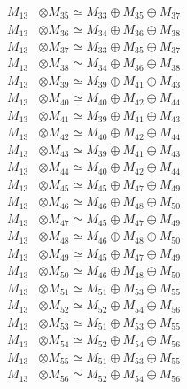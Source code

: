 \begin{align*}
M_{13} &\otimes M_{35} \simeq M_{33} \oplus M_{35} \oplus M_{37} \\
M_{13} &\otimes M_{36} \simeq M_{34} \oplus M_{36} \oplus M_{38} \\
M_{13} &\otimes M_{37} \simeq M_{33} \oplus M_{35} \oplus M_{37} \\
M_{13} &\otimes M_{38} \simeq M_{34} \oplus M_{36} \oplus M_{38} \\
M_{13} &\otimes M_{39} \simeq M_{39} \oplus M_{41} \oplus M_{43} \\
M_{13} &\otimes M_{40} \simeq M_{40} \oplus M_{42} \oplus M_{44} \\
M_{13} &\otimes M_{41} \simeq M_{39} \oplus M_{41} \oplus M_{43} \\
M_{13} &\otimes M_{42} \simeq M_{40} \oplus M_{42} \oplus M_{44} \\
M_{13} &\otimes M_{43} \simeq M_{39} \oplus M_{41} \oplus M_{43} \\
M_{13} &\otimes M_{44} \simeq M_{40} \oplus M_{42} \oplus M_{44} \\
M_{13} &\otimes M_{45} \simeq M_{45} \oplus M_{47} \oplus M_{49} \\
M_{13} &\otimes M_{46} \simeq M_{46} \oplus M_{48} \oplus M_{50} \\
M_{13} &\otimes M_{47} \simeq M_{45} \oplus M_{47} \oplus M_{49} \\
M_{13} &\otimes M_{48} \simeq M_{46} \oplus M_{48} \oplus M_{50} \\
M_{13} &\otimes M_{49} \simeq M_{45} \oplus M_{47} \oplus M_{49} \\
M_{13} &\otimes M_{50} \simeq M_{46} \oplus M_{48} \oplus M_{50} \\
M_{13} &\otimes M_{51} \simeq M_{51} \oplus M_{53} \oplus M_{55} \\
M_{13} &\otimes M_{52} \simeq M_{52} \oplus M_{54} \oplus M_{56} \\
M_{13} &\otimes M_{53} \simeq M_{51} \oplus M_{53} \oplus M_{55} \\
M_{13} &\otimes M_{54} \simeq M_{52} \oplus M_{54} \oplus M_{56} \\
M_{13} &\otimes M_{55} \simeq M_{51} \oplus M_{53} \oplus M_{55} \\
M_{13} &\otimes M_{56} \simeq M_{52} \oplus M_{54} \oplus M_{56} \\
\end{align*}

